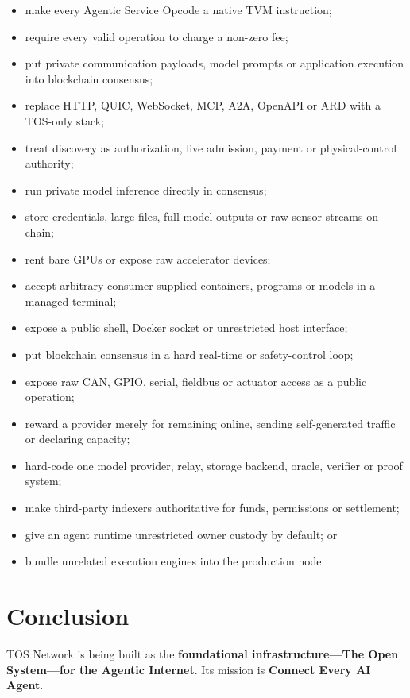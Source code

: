 \documentclass[11pt,oneside]{article}
\begin{document}
\begin{itemize}
  \item make every Agentic Service Opcode a native TVM instruction;
  \item require every valid operation to charge a non-zero fee;
  \item put private communication payloads, model prompts or application execution into
        blockchain consensus;
  \item replace HTTP, QUIC, WebSocket, MCP, A2A, OpenAPI or ARD with a TOS-only stack;
  \item treat discovery as authorization, live admission, payment or physical-control
        authority;
  \item run private model inference directly in consensus;
  \item store credentials, large files, full model outputs or raw sensor streams on-chain;
  \item rent bare GPUs or expose raw accelerator devices;
  \item accept arbitrary consumer-supplied containers, programs or models in a managed
        terminal;
  \item expose a public shell, Docker socket or unrestricted host interface;
  \item put blockchain consensus in a hard real-time or safety-control loop;
  \item expose raw CAN, GPIO, serial, fieldbus or actuator access as a public operation;
  \item reward a provider merely for remaining online, sending self-generated traffic or
        declaring capacity;
  \item hard-code one model provider, relay, storage backend, oracle, verifier or proof
        system;
  \item make third-party indexers authoritative for funds, permissions or settlement;
  \item give an agent runtime unrestricted owner custody by default; or
  \item bundle unrelated execution engines into the production node.
\end{itemize}

\section{Conclusion}

TOS Network is being built as the \textbf{foundational infrastructure---The Open System---for
the Agentic Internet}. Its mission is \textbf{Connect Every AI Agent}.
\end{document}
